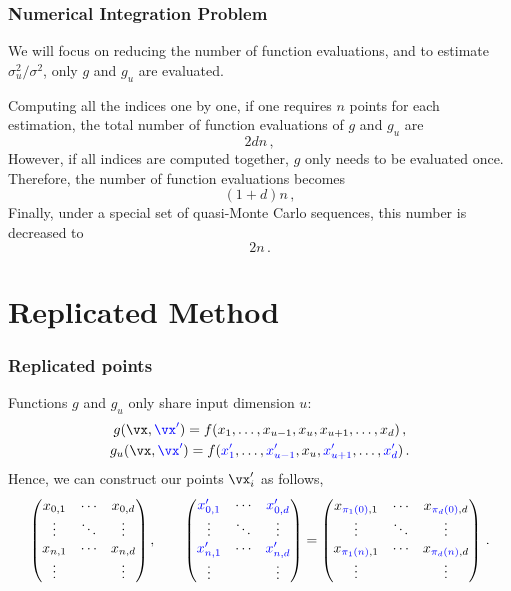 \documentclass[11pt,compress]{beamer} %
\begin{document}
\begin{frame}
\frametitle{Numerical Integration Problem}
We will focus on reducing the number of function evaluations, and to estimate $\sigma_u^2/\sigma^2$, only $g$ and $g_u$ are evaluated.

Computing all the indices one by one, if one requires $n$ points for each estimation, the total number of function evaluations of $g$ and $g_u$ are
\[
2dn\, ,
\]
However, if all indices are computed together, $g$ only needs to be evaluated once. Therefore, the number of function evaluations becomes
\[
(1+d)n\, ,
\]
Finally, under a special set of quasi-Monte Carlo sequences, this number is decreased to
\[
2n\, .
\]
\end{frame}

\section{Replicated Method}

\begin{frame}
\frametitle{Replicated points}
Functions $g$ and $g_u$ only share input dimension $u$:
\begin{gather*}
g(\vx,{\color{blue}\vx'})=f(x_1,\dots,x_{u-1},x_u,x_{u+1},\dots,x_d)\, ,\\
g_u(\vx,{\color{blue}\vx'})=f({\color{blue}x'_1},\dots,{\color{blue}x'_{u-1}},x_u,{\color{blue}x'_{u+1}},\dots,{\color{blue}x'_d})\, .
\end{gather*}
Hence, we can construct our points $\vx'_i$ as follows,
\begin{equation*}
\begin{pmatrix}
x_{0,1} & \cdots & x_{0,d} \\
\vdots & \ddots & \vdots \\
x_{n,1} & \cdots & x_{n,d} \\
\vdots &  & \vdots
\end{pmatrix},\qquad
\begin{pmatrix}
{\color{blue}x'_{0,1}} & \cdots & {\color{blue}x'_{0,d}} \\
\vdots & \ddots & \vdots \\
{\color{blue}x'_{n,1}} & \cdots & {\color{blue}x'_{n,d}} \\
\vdots &  & \vdots
\end{pmatrix}=
\begin{pmatrix}
x_{{\color{blue}\pi_1(0)},1} & \cdots & x_{{\color{blue}\pi_d(0)},d} \\
\vdots & \ddots & \vdots \\
x_{{\color{blue}\pi_1(n)},1} & \cdots & x_{{\color{blue}\pi_d(n)},d} \\
\vdots &  & \vdots \\
\end{pmatrix}\, .
\end{equation*}
\end{frame}
\end{document}
